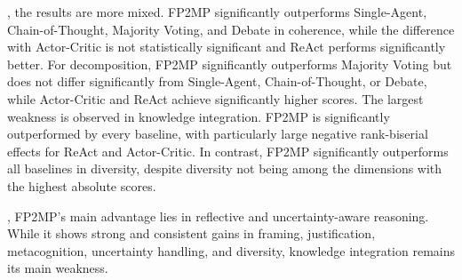 , the results are more mixed.
FP2MP significantly outperforms Single-Agent, Chain-of-Thought, Majority Voting, and Debate in coherence, while the difference with Actor-Critic is not statistically significant and ReAct performs significantly better.
For decomposition, FP2MP significantly outperforms Majority Voting but does not differ significantly from Single-Agent, Chain-of-Thought, or Debate, while Actor-Critic and ReAct achieve significantly higher scores.
The largest weakness is observed in knowledge integration.
FP2MP is significantly outperformed by every baseline, with particularly large negative rank-biserial effects for ReAct and Actor-Critic.
In contrast, FP2MP significantly outperforms all baselines in diversity, despite diversity not being among the dimensions with the highest absolute scores.

, FP2MP's main advantage lies in reflective and uncertainty-aware reasoning.
While it shows strong and consistent gains in framing, justification, metacognition, uncertainty handling, and diversity, knowledge integration remains its main weakness.
